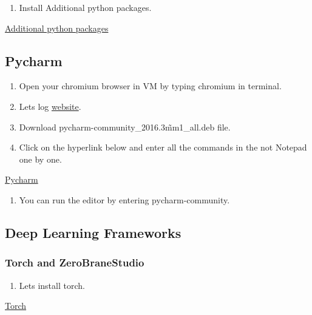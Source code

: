 \documentclass[12pt]{article}
\begin{document}
\begin{enumerate}[resume]
  \item Install Additional python packages.
\end{enumerate}

\begin{center}
\href{run:./Text_Files_16/AdPP.txt}{\Large Additional python packages}
\end{center}

\subsection{Pycharm}

\begin{enumerate}[resume]
  \item Open your chromium browser in VM by typing chromium in terminal.
  \item Lets log   \href{http://ppa.launchpad.net/mystic-mirage/pycharm/ubuntu/pool/main/p/pycharm/}{website}.
  \item Download pycharm-community\_2016.3\~mm1\_all.deb file.	
  \item Click on the hyperlink below and enter all the commands in the not Notepad one by one.
\end{enumerate}

\begin{center}
\href{run:./Text_Files_16/Pycharm.txt}{\Large Pycharm}
\end{center}

\begin{enumerate}[resume]
  \item You can run the editor by entering pycharm-community.
\end{enumerate}

\subsection{Deep Learning Frameworks}

\subsubsection{Torch and ZeroBraneStudio}

\begin{enumerate}[resume]
  \item Lets install torch.
\end{enumerate}

\begin{center}
\href{run:./Text_Files_16/Torch.txt}{\Large Torch}
\end{center}
\end{document}
